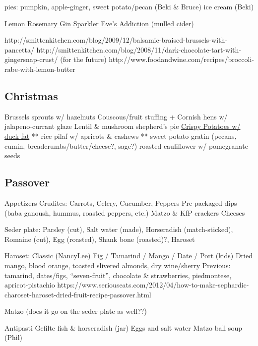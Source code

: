 pies: pumpkin, apple-ginger, sweet potato/pecan (Beki \& Bruce)
ice cream (Beki)

\href{https://www.seriouseats.com/recipes/2014/11/gin-cocktail-for-crowds-charred-lemon-rosemary-drink-recipe.html}{Lemon Rosemary Gin Sparkler}
\href{https://www.seriouseats.com/recipes/2013/11/eves-addiction-hot-mulled-cider-recipe.html}{Eve's Addiction (mulled cider)}

http://smittenkitchen.com/blog/2009/12/balsamic-braised-brussels-with-pancetta/
http://smittenkitchen.com/blog/2008/11/dark-chocolate-tart-with-gingersnap-crust/ (for the future)
http://www.foodandwine.com/recipes/broccoli-rabe-with-lemon-butter

\subsection{Christmas}
Brussels sprouts w/ hazelnuts
Couscous/fruit stuffing + Cornish hens w/ jalapeno-currant glaze
Lentil \& mushroom shepherd's pie
\href{http://www.seriouseats.com/recipes/2011/11/ultra-crispy-roast-potatoes-recipe.html}{Crispy Potatoes w/ duck fat}
** rice pilaf w/ apricots & cashews
** sweet potato gratin (pecans, cumin, breadcrumbs/butter/cheese?, sage?)
roasted cauliflower w/ pomegranate seeds

\subsection{Passover}
Appetizers
Crudites: Carrots, Celery, Cucumber, Peppers
Pre-packaged dips (baba ganoush, hummus, roasted peppers, etc.)
Matzo \& KfP crackers
Cheeses

Seder plate: Parsley (cut), Salt water (made), Horseradish (match-sticked), Romaine (cut), Egg (roasted), Shank bone (roasted)?, Haroset

Haroset: Classic (NancyLee)
Fig / Tamarind / Mango / Date / Port (kids)
Dried mango, blood orange, toasted slivered almonds, dry wine/sherry
Previous: tamarind, dates/figs, “seven-fruit”, chocolate & strawberries, piedmontese, apricot-pistachio
https://www.seriouseats.com/2012/04/how-to-make-sephardic-charoset-haroset-dried-fruit-recipe-passover.html

Matzo (does it go on the seder plate as well??)

Antipasti
Gefilte fish & horseradish (jar)
Eggs and salt water
Matzo ball soup (Phil)


